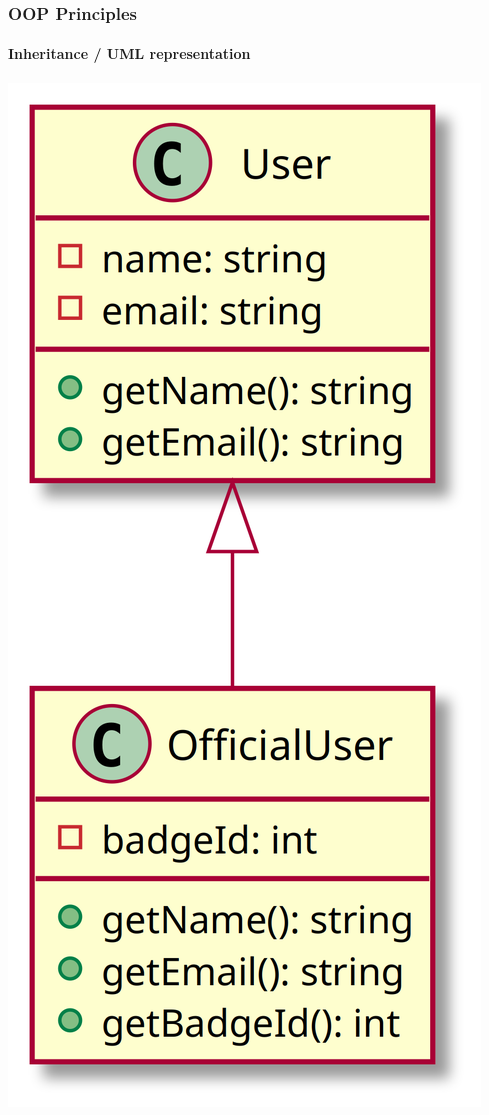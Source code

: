 \begin{frame}[fragile,c]
    \frametitle{OOP Principles}
    \framesubtitle{Inheritance / UML representation}

    \begin{center}
        \includegraphics[height=.75\textheight]{src/session--composition-and-inheritance/resources/Inheritance.png}
    \end{center}
\end{frame}

